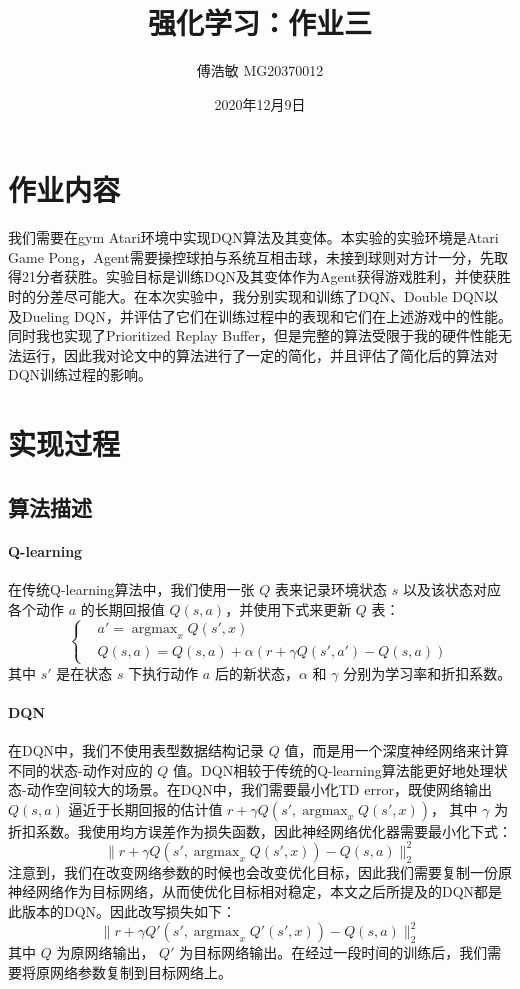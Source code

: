 \documentclass[a4paper,12pt]{article}
\begin{document}
\begin{CJK}{UTF8}{gbsn}

\title{强化学习：作业三}

\author{傅浩敏 MG20370012}

\date{2020年12月9日}

\maketitle

\section{作业内容}
我们需要在gym Atari环境中实现DQN算法及其变体。本实验的实验环境是Atari Game Pong，Agent需要操控球拍与系统互相击球，未接到球则对方计一分，先取得21分者获胜。实验目标是训练DQN及其变体作为Agent获得游戏胜利，并使获胜时的分差尽可能大。在本次实验中，我分别实现和训练了DQN\cite{ref1}\cite{2}、Double DQN\cite{ref3}以及Dueling DQN\cite{ref4}，并评估了它们在训练过程中的表现和它们在上述游戏中的性能。同时我也实现了Prioritized Replay Buffer\cite{ref6}，但是完整的算法受限于我的硬件性能无法运行，因此我对论文中的算法进行了一定的简化，并且评估了简化后的算法对DQN训练过程的影响。

\section{实现过程}
\subsection{算法描述}
\paragraph{Q-learning\cite{ref5}} 在传统Q-learning算法中，我们使用一张 $Q$ 表来记录环境状态 $s$ 以及该状态对应各个动作 $a$ 的长期回报值 $Q(s,a)$，并使用下式来更新 $Q$ 表：
$$
\begin{cases}
	&a'= \mathop{\arg\max}_{x} Q(s',x)\\
	&Q(s,a)=Q(s,a)+\alpha(r+\gamma Q(s',a')-Q(s,a)) 
\end{cases}
$$
其中 $s'$ 是在状态 $s$ 下执行动作 $a$ 后的新状态，$\alpha$ 和 $\gamma$ 分别为学习率和折扣系数。
\paragraph{DQN} 在DQN中，我们不使用表型数据结构记录 $Q$ 值，而是用一个深度神经网络来计算不同的状态-动作对应的 $Q$ 值。DQN相较于传统的Q-learning算法能更好地处理状态-动作空间较大的场景。在DQN中，我们需要最小化TD error，既使网络输出 $Q(s,a)$ 逼近于长期回报的估计值 $r+\gamma Q(s',\mathop{\arg\max}_{x} Q(s',x))$， 其中 $\gamma$ 为折扣系数。我使用均方误差作为损失函数，因此神经网络优化器需要最小化下式：
$$
\|r+\gamma Q(s',\mathop{\arg\max}_{x} Q(s',x))-Q(s,a)\|_2^2
$$
注意到，我们在改变网络参数的时候也会改变优化目标，因此我们需要复制一份原神经网络作为目标网络，从而使优化目标相对稳定，本文之后所提及的DQN都是此版本的DQN\cite{ref2}。因此改写损失如下：
$$
\|r+\gamma Q'(s',\mathop{\arg\max}_{x} Q'(s',x))-Q(s,a)\|_2^2
$$
其中 $Q$ 为原网络输出， $Q'$ 为目标网络输出。在经过一段时间的训练后，我们需要将原网络参数复制到目标网络上。

\end{CJK}
\end{document}
